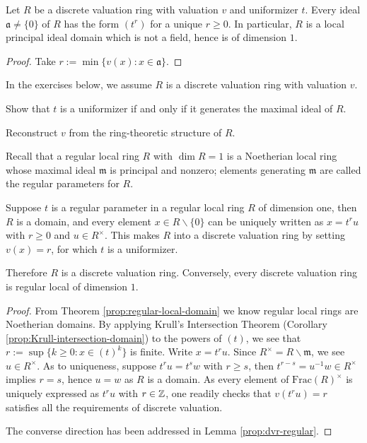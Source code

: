 \begin{lemma}\label{prop:dvr-regular}
	Let $R$ be a discrete valuation ring with valuation $v$ and uniformizer $t$. Every ideal $\mathfrak{a} \neq \{0\}$ of $R$ has the form $(t^r)$ for a unique $r \geq 0$. In particular, $R$ is a local principal ideal domain which is not a field, hence is of dimension $1$.
\end{lemma}
\begin{proof}
	Take $r := \min\{v(x) : x \in \mathfrak{a} \}$.
\end{proof}

In the exercises below, we assume $R$ is a discrete valuation ring with valuation $v$.
\begin{exercise}
	Show that $t$ is a uniformizer if and only if it generates the maximal ideal of $R$.
\end{exercise}
\begin{exercise}
	Reconstruct $v$ from the ring-theoretic structure of $R$.
\end{exercise}

Recall that a regular local ring $R$ with $\dim R = 1$ is a Noetherian local ring whose maximal ideal $\mathfrak{m}$ is principal and nonzero; elements generating $\mathfrak{m}$ are called the regular parameters for $R$.
\begin{proposition}\label{prop:reg-local-dvr}
	Suppose $t$ is a regular parameter in a regular local ring $R$ of dimension one, then $R$ is a domain, and every element $x \in R \smallsetminus \{0\}$ can be uniquely written as $x = t^r u$ with $r \geq 0$ and $u \in R^\times$. This makes $R$ into a discrete valuation ring by setting $v(x) = r$, for which $t$ is a uniformizer.
	
	Therefore $R$ is a discrete valuation ring. Conversely, every discrete valuation ring is regular local of dimension $1$.
\end{proposition}
\begin{proof}
	From Theorem \ref{prop:regular-local-domain} we know regular local rings are Noetherian domains. By applying Krull's Intersection Theorem (Corollary \ref{prop:Krull-intersection-domain}) to the powers of $(t)$, we see that $r := \sup\{k \geq 0: x \in (t)^k \}$ is finite. Write $x = t^r u$. Since $R^\times = R \smallsetminus \mathfrak{m}$, we see $u \in R^\times$. As to uniqueness, suppose $t^r u = t^s w$ with $r \geq s$, then $t^{r-s} = u^{-1}w \in R^\times$ implies $r=s$, hence $u=w$ as $R$ is a domain. As every element of $\text{Frac}(R)^\times$ is uniquely expressed as $t^r u$ with $r \in \mathbb{Z}$, one readily checks that $v(t^r u) = r$ satisfies all the requirements of discrete valuation.
	
	The converse direction has been addressed in Lemma \ref{prop:dvr-regular}.
\end{proof}

